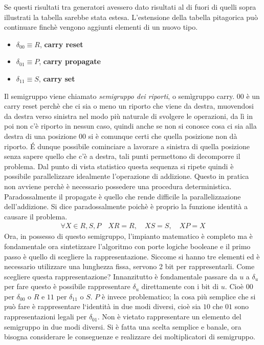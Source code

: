 \documentclass[a4paper,portrait,12pt]{article}
\theoremstyle{definition}
\begin{document}
Se questi risultati tra generatori avessero dato risultati al di fuori di quelli sopra illustrati la tabella sarebbe stata estesa.
L’estensione della tabella pitagorica può continuare finchè vengono aggiunti elementi di un nuovo tipo.
\begin{itemize}
\item $\delta_{00} \equiv R$, \textbf{carry reset}
\item $\delta_{01} \equiv P$, \textbf{carry propagate}
\item $\delta_{11} \equiv S$, \textbf{carry set}
\end{itemize}
Il semigruppo viene chiamato \textit{semigruppo dei riporti}, o semìgruppo carry.
$00$ è un carry reset perchè che ci sia o meno un riporto che viene da destra, muovendosi da destra verso sinistra nel modo più naturale di svolgere le operazioni, da lì in poi non c’è riporto in nessun caso, quindi anche se non si conosce cosa ci sia alla destra di una posizione $00$ si è comunque certi che quella posizione non dà riporto.
\'E dunque possibile cominciare a lavorare a sinistra di quella posizione senza sapere quello che c’è a destra, tali punti permettono di decomporre il problema.
Dal punto di vista statistico questa sequenza si ripete quindi è possibile parallelizzare idealmente l’operazione di addizione.
Questo in pratica non avviene perchè è necessario possedere una procedura deterministica.
Paradossalmente il propagate è quello che rende difficile la parallelizzazione dell’addizione.
Si dice paradossalmente poichè è proprio la funzione identità a causare il problema.
\begin{gather*}
\forall X\in R,S,P\quad XR = R,\quad XS = S,\quad XP = X
\end{gather*}
Ora, in possesso di questo semigruppo, l’impianto matematico è completo ma è fondamentale ora sintetizzare l’algoritmo con porte logiche booleane e il primo passo è quello di scegliere la rappresentazione.
Siccome si hanno tre elementi ed è necessario utilizzare una lunghezza fissa, servono 2 bit per rappresentarli.
Come scegliere questa rappresentazione?
Innanzitutto è fondamentale passare da $u$ a $\delta_u$ per fare questo è possibile rappresentare $\delta_u$ direttamente con i bit di $u$. Cioè $00$ per $\delta_{00}$ o $R$ e $11$ per $\delta_{11}$ o $S$. $P$ è invece problematico; la cosa più semplice che si può fare è rappresentare l‘identità in due modi diversi, cioè sia $10$ che $01$ sono rappresentazioni legali per $\delta_{01}$. Non è vietato rappresentare un elemento del semigruppo in due modi diversi.
Si è fatta una scelta semplice e banale, ora bisogna considerare le conseguenze e realizzare dei moltiplicatori di semigruppo.
\end{document}
